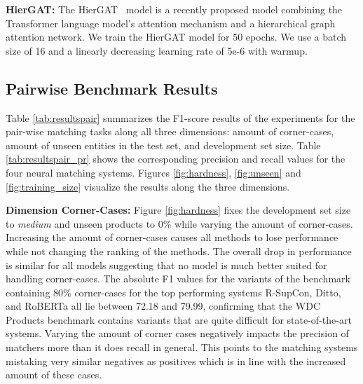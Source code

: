 \documentclass[sigconf,edbt]{acmart-edbt2024}
\begin{document}
\textbf{HierGAT:} The HierGAT~\cite{yaoEntityResolutionHierarchical2022} model is a recently proposed model combining the Transformer language model's attention mechanism and a hierarchical graph attention network. We train the HierGAT model for 50 epochs. We use a batch size of 16 and a linearly decreasing learning rate of 5e-6 with warmup.



\subsection{Pairwise Benchmark Results}
\label{subsec:results}


Table \ref{tab:resultspair} summarizes the F1-score results of the experiments for the pair-wise matching tasks along all three dimensions: amount of corner-cases, amount of unseen entities in the test set, and development set size. Table \ref{tab:resultspair_pr} shows the corresponding precision and recall values for the four neural matching systems. Figures \ref{fig:hardness}, \ref{fig:unseen} and \ref{fig:training_size} visualize the results along the three dimensions.

\textbf{Dimension Corner-Cases:} Figure \ref{fig:hardness} fixes the development set size to \textit{medium} and unseen products to 0\% while varying the amount of corner-cases. Increasing the amount of corner-cases causes all methods to lose performance while not changing the ranking of the methods. The overall drop in performance is similar for all models suggesting that no model is much better suited for handling corner-cases. The absolute F1 values for the variants of the benchmark containing 80\% corner-cases for the top performing systems R-SupCon, Ditto, and RoBERTa all lie between 72.18 and 79.99, confirming that the WDC Products benchmark contains variants that are quite difficult for state-of-the-art systems. Varying the amount of corner cases negatively impacts the precision of matchers more than it does recall in general. This points to the matching systems mistaking very similar negatives as positives which is in line with the increased amount of these cases.
\end{document}
